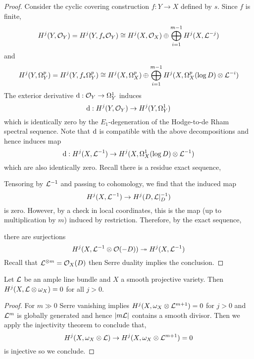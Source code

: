 \documentclass[12pt]{article}
\begin{document}
\begin{proof}
Consider the cyclic covering construction $f : Y \to X$ defined by $s$. Since $f$ is finite,
\[ H^j(Y, \mathcal{O}_{Y}) = H^j(Y, f_* \mathcal{O}_{Y}) \cong H^j(X, \mathcal{O}_{X}) \oplus \bigoplus_{i = 1}^{m-1} H^j(X, \mathcal{L}^{-j}) \]
and
\[ H^j(Y, \Omega_Y^p) = H^j(Y, f_* \Omega_Y^p) \cong H^j(X, \Omega_X^p) \oplus \bigoplus_{i = 1}^{m-1} H^j(X, \Omega_X^p(\log D) \otimes \mathcal{L}^{-i}) \]
The exterior derivative $\mathrm{d} : \mathcal{O}_{Y} \to \Omega_Y^1$ induces
\[ \mathrm{d} : H^j(Y, \mathcal{O}_{Y}) \to H^j(Y, \Omega_Y^1) \]
which is identically zero by the $E_1$-degeneration of the Hodge-to-de Rham spectral sequence. Note that $\mathrm{d}$ is compatible with the above decompositions and hence induces map
\[ \mathrm{d} : H^j(X, \mathcal{L}^{-1}) \to H^j(X, \Omega_X^1(\log D) \otimes \mathcal{L}^{-1}) \]
which are also identically zero. Recall there is a residue exact sequence,
\begin{center}
\end{center}
Tensoring by $\mathcal{L}^{-1}$ and passing to cohomology, we find that the induced map
\[ H^j(X, \mathcal{L}^{-1}) \to H^j(D, \mathcal{L}|_D^{-1}) \]
is zero. However, by a check in local coordinates, this is the map (up to multiplication by $m$) induced by restriction. Therefore, by the exact sequence,
\begin{center}
\end{center}
there are surjections
\[ H^j(X, \mathcal{L}^{-1} \otimes \mathcal{O}(-D)) \twoheadrightarrow H^j(X, \mathcal{L}^{-1}) \]
Recall that $\mathcal{L}^{\otimes m} = \mathcal{O}_{X}(D)$ then Serre duality implies the conclusion.
\end{proof}

\begin{theorem}
Let $\mathcal{L}$ be an ample line bundle and $X$ a smooth projective variety. Then $H^j(X, \mathcal{L} \otimes \omega_X) = 0$ for all $j > 0$.
\end{theorem}

\begin{proof}
For $m \gg 0$ Serre vanishing implies $H^j(X, \omega_X \otimes \mathcal{L}^{m+1}) = 0$ for $j > 0$ and $\mathcal{L}^{m}$ is globally generated and hence $| m \mathcal{L} |$ contains a smooth divisor. Then we apply the injectivity theorem to conclude that,
\[ H^j(X, \omega_X \otimes \mathcal{L}) \to H^j(X, \omega_X \otimes \mathcal{L}^{m + 1}) = 0 \]
is injective so we conclude.
\end{proof}
\end{document}
